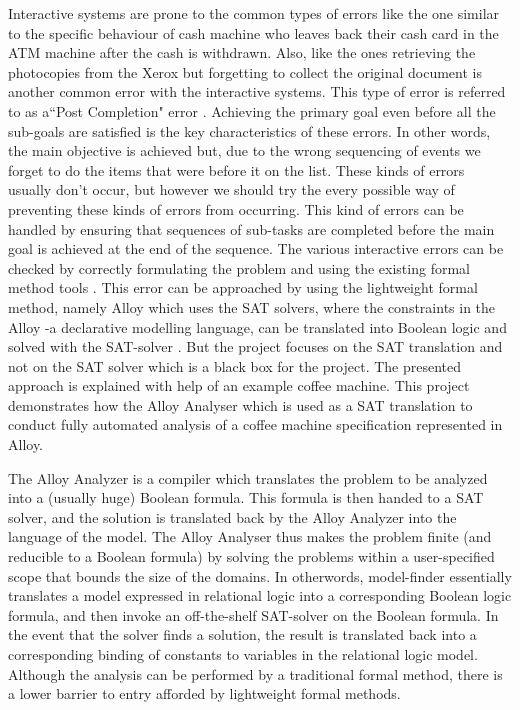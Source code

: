 \documentclass[a4paper,10pt]{report}
\begin{document}
Interactive systems are prone to the common types of errors like the one similar to the specific behaviour of cash machine who leaves back their cash card in the ATM machine after the cash is withdrawn. Also, like the ones retrieving the photocopies from the Xerox but forgetting to collect the original document is another common error with the interactive systems. This type of error is referred to as a``Post Completion" error \cite{Boyatt}. Achieving the primary goal even before all the sub-goals are satisfied is the key characteristics of these errors. In other words, the main objective is achieved but, due to the wrong sequencing of events we forget to do the items that were before it on the list. These kinds of errors usually don't occur, but however we should try the every possible way of preventing these kinds of errors from occurring. This kind of errors can be handled by ensuring that sequences of sub-tasks are completed before the main goal is achieved at the end of the sequence. The various interactive errors can be checked by correctly formulating the problem and using the existing formal method tools \cite{P.Curson}. This error can be approached by using the lightweight formal method, namely Alloy which uses the SAT solvers, where the constraints in the Alloy -a declarative modelling language, can be translated into Boolean logic and solved with the SAT-solver \cite{Yeung2005}. But the project focuses on the SAT translation and not on the  SAT solver which is a black box for the project. The presented approach is explained with help of an example coffee machine. This project demonstrates how the Alloy Analyser which is used as a SAT translation to conduct fully automated analysis of a coffee machine specification represented in Alloy. 

The Alloy Analyzer is a compiler which translates the problem to be analyzed into a (usually huge) Boolean formula. This formula is then handed to a SAT solver, and the solution is translated back by the Alloy Analyzer into the language of the model. The Alloy Analyser thus makes the problem finite (and reducible to a Boolean formula) by solving the problems within a user-specified scope that bounds the size of the domains. In otherwords, model-finder essentially translates a model expressed in relational logic into a corresponding Boolean logic formula, and then invoke an off-the-shelf SAT-solver on the Boolean formula. In the event that the solver finds a solution, the result is translated back into a corresponding binding of constants to variables in the relational logic model. Although the analysis can be performed by a traditional formal method, there is a lower barrier to entry afforded by lightweight formal methods.
\end{document}
